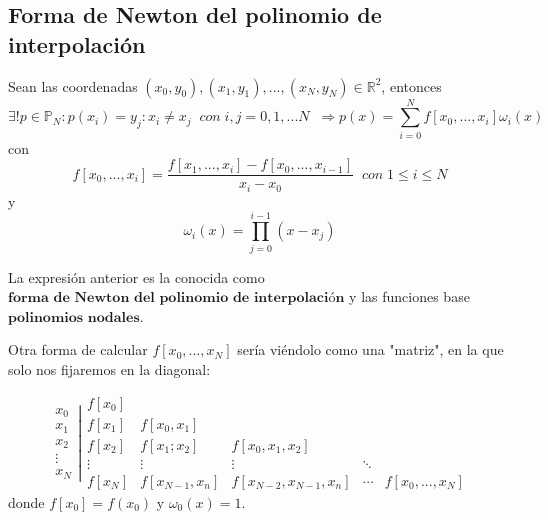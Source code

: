 \subsection{Forma de Newton del polinomio de interpolación}
\begin{nth}
Sean las coordenadas $(x_0,y_0), (x_1,y_1),...,(x_N,y_N) \in \mathbb{R}^2$, entonces
\[ \exists ! p \in \mathbb{P} _N : p(x_i) = y_j : x_i \neq x_j \; \; con \; i,j = 0,1,...N \; \; \Rightarrow p(x) = \sum_{i=0}^N f \left[ x_0,...,x_i \right] \omega _i(x) \]
con
\[ f \left[ x_0,...,x_i \right] = \frac{f \left[ x_1,...,x_i \right] - f \left[ x_0,...,x_{i-1} \right] }{x_i - x_0} \; \; con \; 1 \leq i \leq N\]
y
\[ \omega _i(x) = \prod _{j=0}^{i-1} (x-x_j) \]
\end{nth}
La expresión anterior es la conocida como $\textbf{forma de Newton del polinomio de
interpolación}$ y las funciones base $\textbf{polinomios nodales}$.

Otra forma de calcular $f \left[ x_0,...,x_N \right]$ sería viéndolo como una "matriz", en la que solo nos fijaremos en la diagonal:

\[
\left. \begin{array}{c}
x_0 \\
x_1 \\
x_2 \\
\vdots \\
x_N
\end{array} \right|
\begin{array}{ccccc}
f \left[ x_0 \right] & & & & \\
f \left[ x_1 \right] & f \left[ x_0,x_1 \right] & & & \\
f \left[ x_2 \right] & f \left[ x_1;x_2 \right] & f \left[ x_0,x_1,x_2 \right] & & \\
\vdots & \vdots & \vdots & \ddots & \\
f \left[ x_N \right] & f \left[ x_{N-1},x_n \right] & f \left[ x_{N-2},x_{N-1},x_n \right] & \cdots & f \left[ x_0,...,x_N \right]
\end{array}
\]
donde $f \left[ x_0 \right] = f(x_0)$ y $\omega _0(x) = 1$.

